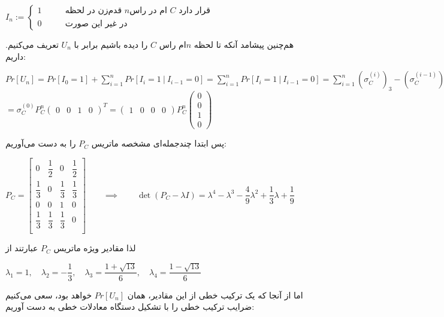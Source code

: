 \documentclass{scribe-cgenomics}
\begin{document}
\begin{حل}
\begin{center}
$
I_n :=
\begin{cases}
1 & \qquad \text{قدم‌زن در لحظه $n$ام در راس $C$ قرار دارد}\\
0 & \qquad \text{در غیر این صورت}
\end{cases}
$
\end{center}

هم‌چنین پیشامد آنکه تا لحظه
$n$ام
راس
$C$
را دیده باشیم برابر با
$U_n$
تعریف می‌کنیم. داریم:

\begin{center}
$
Pr[U_n] = Pr[I_0 = 1] + \sum_{i=1}^{n}Pr[I_i=1\ |\ I_{i-1}=0]
= \sum_{i=1}^{n} Pr[I_i=1\ |\ I_{i-1}=0]
= \sum_{i=1}^{n} (\sigma_C^{(i)})_3 - (\sigma_C^{(i-1)})_3
= (\sigma_C^{(n)})_3
$
\bigbreak
$
= \sigma_C^{(0)} P_C^n \begin{pmatrix}
0 & 0 & 1 & 0
\end{pmatrix}^T
= \begin{pmatrix}
1 & 0 & 0 & 0
\end{pmatrix}
P_C^n \begin{pmatrix}
0 \\ 0 \\ 1 \\ 0
\end{pmatrix}
$
\end{center}

پس ابتدا چندجمله‌ای مشخصه ماتریس
$P_C$
را به دست می‌آوریم:

\begin{center}
$
P_C = 
\begin{bmatrix}
0 & \dfrac{1}{2} & 0& \dfrac{1}{2}\\
\dfrac{1}{3} & 0 & \dfrac{1}{3} & \dfrac{1}{3}\\
0& 0 & 1 & 0\\
\dfrac{1}{3} & \dfrac{1}{3} & \dfrac{1}{3} & 0\\
\end{bmatrix}
\qquad \implies \qquad \det(P_C - \lambda I) = \lambda^4 - \lambda^3 - \dfrac{4}{9}\lambda^2 + \dfrac{1}{3}\lambda + \dfrac{1}{9}
$
\end{center}

لذا مقادیر ویژه ماتریس
$P_C$
عبارتند از


\begin{center}
$
\lambda_1 = 1,\quad 
\lambda_2 = -\dfrac{1}{3},\quad 
\lambda_3 = \dfrac{1 + \sqrt{13}}{6},\quad 
\lambda_4 = \dfrac{1 - \sqrt{13}}{6}
$
\end{center}

اما از آنجا که یک ترکیب خطی از این مقادیر، همان
$Pr[U_n]$
خواهد بود، سعی می‌کنیم ضرایب ترکیب خطی را با تشکیل دستگاه معادلات خطی به دست آوریم:


\end{حل}
\end{document}

